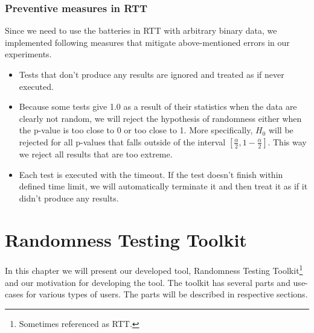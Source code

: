 \documentclass[
  digital,  	%
  color,		%
  oneside,   	%
  12pt,
  nocover,
  notable,
  nolof,
  nolot,
]{fithesis3}
\begin{document}
\subsection{Preventive measures in RTT}
Since we need to use the batteries in RTT with arbitrary binary data, we implemented following measures that mitigate above-mentioned errors in our experiments.
\begin{itemize}
\item Tests that don't produce any results are ignored and treated as if never executed.
\item Because some tests give 1.0 as a result of their statistics when the data are clearly not random, we will reject the hypothesis of randomness either when the p-value is too close to 0 or too close to 1. More specifically, $H_0$ will be rejected for all p-values that falls outside of the interval $\left[\frac{\alpha}{2}, 1-\frac{\alpha}{2}\right]$. This way we reject all results that are too extreme.
\item Each test is executed with the timeout. If the test doesn't finish within defined time limit, we will automatically terminate it and then treat it as if it didn't produce any results.
\end{itemize}

\chapter{Randomness Testing Toolkit}
In this chapter we will present our developed tool, Randomness Testing Toolkit\footnote{Sometimes referenced as RTT.} and our motivation for developing the tool. The toolkit has several parts and use-cases for various types of users. The parts will be described in respective sections.
\end{document}
